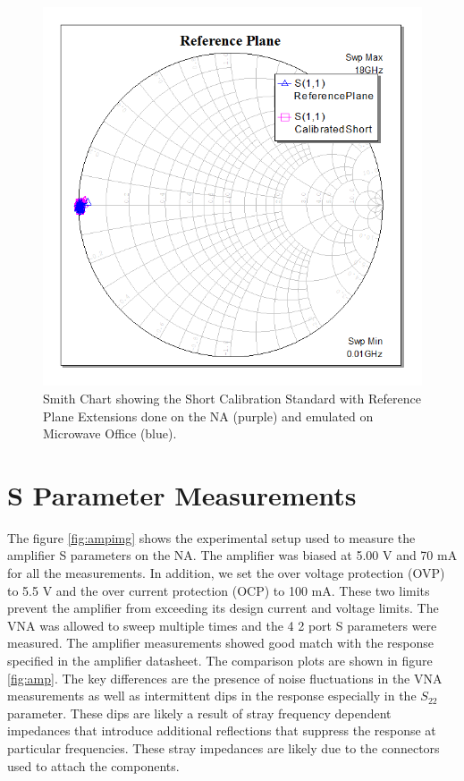 \documentclass[twocolumn, aps, apl]{revtex4-1}
\begin{document}
\begin{figure}[!htbp]
    \centering
    \includegraphics[scale=0.5]{CalibratedShort.png}
    \caption{Smith Chart showing the Short Calibration Standard with Reference Plane Extensions done on the NA (purple) and emulated on Microwave Office (blue).}
    \label{fig:calib}
\end{figure}

\FloatBarrier

\section*{S Parameter Measurements}

The figure \ref{fig:ampimg} shows the experimental setup used to measure the amplifier S parameters on the NA. The amplifier was biased at 5.00 V and 70 mA for all the measurements. In addition, we set the over voltage protection (OVP) to 5.5 V and the over current protection (OCP) to 100 mA. These two limits prevent the amplifier from exceeding its design current and voltage limits. The VNA was allowed to sweep multiple times and the 4 2 port S parameters were measured. The amplifier measurements showed good match with the response specified in the amplifier datasheet. The comparison plots are shown in figure \ref{fig:amp}. The key differences are the presence of noise fluctuations in the VNA measurements as well as intermittent dips in the response especially in the $S_{22}$ parameter. These dips are likely a result of stray frequency dependent impedances that introduce additional reflections that suppress the response at particular frequencies. These stray impedances are likely due to the connectors used to attach the components.
\end{document}
